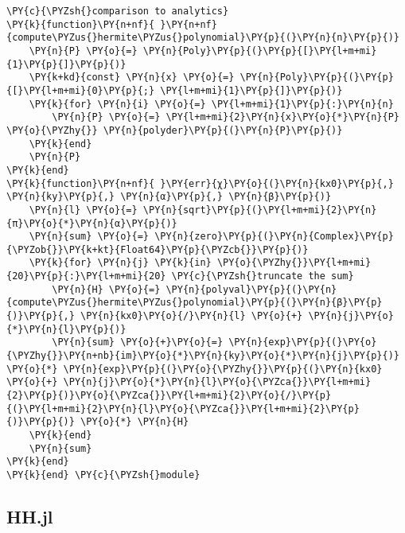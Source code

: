 \begin{Verbatim}[commandchars=\\\{\}]
\PY{c}{\PYZsh{}comparison to analytics}
\PY{k}{function}\PY{n+nf}{ }\PY{n+nf}{compute\PYZus{}hermite\PYZus{}polynomial}\PY{p}{(}\PY{n}{n}\PY{p}{)}
    \PY{n}{P} \PY{o}{=} \PY{n}{Poly}\PY{p}{(}\PY{p}{[}\PY{l+m+mi}{1}\PY{p}{]}\PY{p}{)}
    \PY{k+kd}{const} \PY{n}{x} \PY{o}{=} \PY{n}{Poly}\PY{p}{(}\PY{p}{[}\PY{l+m+mi}{0}\PY{p}{;} \PY{l+m+mi}{1}\PY{p}{]}\PY{p}{)}
    \PY{k}{for} \PY{n}{i} \PY{o}{=} \PY{l+m+mi}{1}\PY{p}{:}\PY{n}{n}
        \PY{n}{P} \PY{o}{=} \PY{l+m+mi}{2}\PY{n}{x}\PY{o}{*}\PY{n}{P} \PY{o}{\PYZhy{}} \PY{n}{polyder}\PY{p}{(}\PY{n}{P}\PY{p}{)}
    \PY{k}{end}
    \PY{n}{P}
\PY{k}{end}
\PY{k}{function}\PY{n+nf}{ }\PY{err}{χ}\PY{o}{(}\PY{n}{kx0}\PY{p}{,} \PY{n}{ky}\PY{p}{,} \PY{n}{α}\PY{p}{,} \PY{n}{β}\PY{p}{)}
    \PY{n}{l} \PY{o}{=} \PY{n}{sqrt}\PY{p}{(}\PY{l+m+mi}{2}\PY{n}{π}\PY{o}{*}\PY{n}{α}\PY{p}{)}
    \PY{n}{sum} \PY{o}{=} \PY{n}{zero}\PY{p}{(}\PY{n}{Complex}\PY{p}{\PYZob{}}\PY{k+kt}{Float64}\PY{p}{\PYZcb{}}\PY{p}{)}
    \PY{k}{for} \PY{n}{j} \PY{k}{in} \PY{o}{\PYZhy{}}\PY{l+m+mi}{20}\PY{p}{:}\PY{l+m+mi}{20} \PY{c}{\PYZsh{}truncate the sum}
        \PY{n}{H} \PY{o}{=} \PY{n}{polyval}\PY{p}{(}\PY{n}{compute\PYZus{}hermite\PYZus{}polynomial}\PY{p}{(}\PY{n}{β}\PY{p}{)}\PY{p}{,} \PY{n}{kx0}\PY{o}{/}\PY{n}{l} \PY{o}{+} \PY{n}{j}\PY{o}{*}\PY{n}{l}\PY{p}{)}
        \PY{n}{sum} \PY{o}{+}\PY{o}{=} \PY{n}{exp}\PY{p}{(}\PY{o}{\PYZhy{}}\PY{n+nb}{im}\PY{o}{*}\PY{n}{ky}\PY{o}{*}\PY{n}{j}\PY{p}{)} \PY{o}{*} \PY{n}{exp}\PY{p}{(}\PY{o}{\PYZhy{}}\PY{p}{(}\PY{n}{kx0} \PY{o}{+} \PY{n}{j}\PY{o}{*}\PY{n}{l}\PY{o}{\PYZca{}}\PY{l+m+mi}{2}\PY{p}{)}\PY{o}{\PYZca{}}\PY{l+m+mi}{2}\PY{o}{/}\PY{p}{(}\PY{l+m+mi}{2}\PY{n}{l}\PY{o}{\PYZca{}}\PY{l+m+mi}{2}\PY{p}{)}\PY{p}{)} \PY{o}{*} \PY{n}{H}
    \PY{k}{end}
    \PY{n}{sum}
\PY{k}{end}
\PY{k}{end} \PY{c}{\PYZsh{}module}
\end{Verbatim}


\subsection{HH.jl}\label{subsec:hh}

